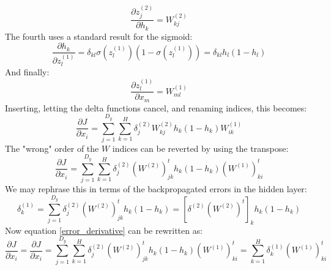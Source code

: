 \documentclass[12pt, a4paper]{article}
\numberwithin{equation}{section}
\begin{document}
\begin{equation}
\frac{\partial z^{(2)}_j}{\partial h_k}=W^{(2)}_{kj}
\end{equation}
The fourth uses a standard result for the sigmoid:
\begin{equation}
\frac{\partial h_k}{\partial z^{(1)}_l}=\delta_{kl}\sigma(z^{(1)}_l)(1-\sigma(z^{(1)}_l))=\delta_{kl}h_l(1-h_l)
\end{equation}
And finally:
\begin{equation}
\frac{\partial z^{(1)}_l}{\partial x_m}=W^{(1)}_{ml}
\end{equation}
Inserting, letting the delta functions cancel, and renaming indices, this becomes:
\begin{equation}
\frac{\partial J}{\partial x_i}=\sum_{j=1}^{D_y}\sum_{k=1}^H\delta^{(2)}_j W^{(2)}_{kj}h_k(1-h_k)W^{(1)}_{ik}
\end{equation}
The "wrong" order of the $W$ indices can be reverted by using the transpose:
\begin{equation}
\label{error_derivative}
\frac{\partial J}{\partial x_i}=\sum_{j=1}^{D_y}\sum_{k=1}^H\delta^{(2)}_j\left(W^{(2)}\right)^t_{jk}h_k(1-h_k)\left(W^{(1)}\right)^t_{ki}
\end{equation}
We may rephrase this in terms of the backpropagated errors in the hidden layer:
\begin{equation}
\label{delta1}
\delta^{(1)}_k=\sum_{j=1}^{D_y}\delta^{(2)}_j\left(W^{(2)}\right)^t_{jk}h_k(1-h_k)=\left[\delta^{(2)}\left(W^{(2)}\right)^t\right]_k h_k(1-h_k)
\end{equation}
Now equation \ref{error_derivative} can be rewritten as:
\begin{equation}
\frac{\partial J}{\partial x_i}=\frac{\partial J}{\partial x_i}=\sum_{j=1}^{D_y}\sum_{k=1}^H\delta^{(2)}_j\left(W^{(2)}\right)^t_{jk}h_k(1-h_k)\left(W^{(1)}\right)^t_{ki}=\sum_{k=1}^H\delta^{(1)}_k\left(W^{(1)}\right)^t_{ki}
\end{equation}
\end{document}
